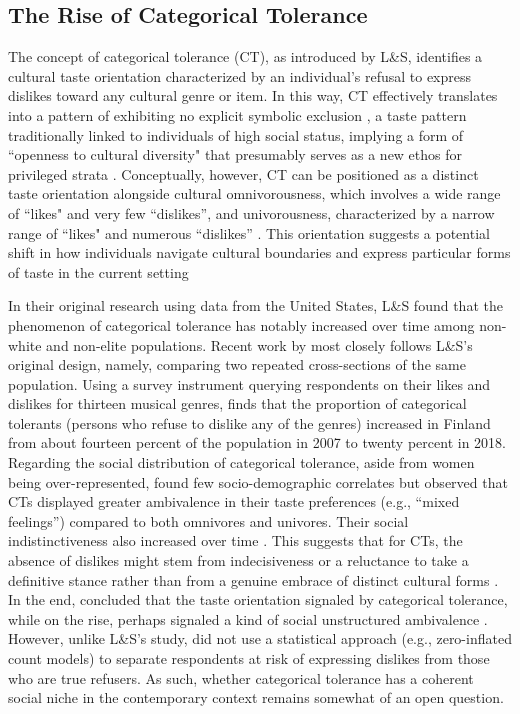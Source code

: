 \documentclass[12pt]{article}
\begin{document}
\subsection*{The Rise of Categorical Tolerance}
The concept of categorical tolerance (CT), as introduced by L\&S, identifies a cultural taste orientation characterized by an individual's refusal to express dislikes toward any cultural genre or item. In this way, CT effectively translates into a pattern of exhibiting no explicit symbolic exclusion \citep{bryson1996anything-311}, a taste pattern traditionally linked to individuals of high social status, implying a form of ``openness to cultural diversity" that presumably serves as a new ethos for privileged strata \citep{ollivier2008modes-96f, lindblom2019anything-530}. Conceptually, however, CT can be positioned as a distinct taste orientation alongside cultural omnivorousness, which involves a wide range of ``likes" and very few ``dislikes'', and univorousness, characterized by a narrow range of ``likes" and numerous ``dislikes'' \citep{lindblom2022growing-ded, sonnett2016ambivalence-352}. This orientation suggests a potential shift in how individuals navigate cultural boundaries and express particular forms of taste in the current setting \citep{lizardo2016end-4fb}

In their original research using data from the United States, L\&S found that the phenomenon of categorical tolerance has notably increased over time among non-white and non-elite populations. Recent work by \citet{lindblom2022growing-ded} most closely follows L\&S's original design, namely, comparing two repeated cross-sections of the same population. Using a survey instrument querying respondents on their likes and dislikes for thirteen musical genres, \citet{lindblom2022growing-ded} finds that the proportion of categorical tolerants (persons who refuse to dislike any of the genres) increased in Finland from about fourteen percent of the population in 2007 to twenty percent in 2018. Regarding the social distribution of categorical tolerance, aside from women being over-represented, \citet{lindblom2022growing-ded} found few socio-demographic correlates but observed that CTs displayed greater ambivalence in their taste preferences (e.g., ``mixed feelings'') compared to both omnivores and univores. Their social indistinctiveness also increased over time \citep{lindblom2022growing-ded}. This suggests that for CTs, the absence of dislikes might stem from indecisiveness or a reluctance to take a definitive stance rather than from a genuine embrace of distinct cultural forms \citep{lindblom2022growing-ded}. In the end, \citet[p. 13]{lindblom2022growing-ded} concluded that the taste orientation signaled by categorical tolerance, while on the rise, perhaps signaled a kind of social unstructured ambivalence \citep{sonnett2004musical-961}. However, unlike L\&S's study, \citet{lindblom2022growing-ded} did not use a statistical approach (e.g., zero-inflated count models) to separate respondents at risk of expressing dislikes from those who are true refusers. As such, whether categorical tolerance has a coherent social niche in the contemporary context remains somewhat of an open question. 
\end{document}

